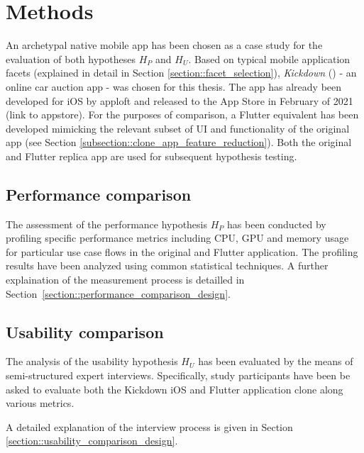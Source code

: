 \section{Methods} \label{section::methods}
An archetypal native mobile app has been chosen as a case study for the evaluation of both hypotheses $H_P$ and $H_U$.
Based on typical mobile application facets (explained in detail in Section \ref{section::facet_selection}), \textit{Kickdown} (\cite{Kickdown2021}) - an online car auction app - was chosen for this thesis. 
The app has already been developed for iOS by apploft and released to the App Store in February of 2021 (link to appstore).
For the purposes of comparison, a Flutter equivalent has been developed mimicking the relevant subset of UI and functionality of the original app (see Section \ref{subsection::clone_app_feature_reduction}). 
Both the original and Flutter replica app are used for subsequent hypothesis testing.


\subsection{Performance comparison}
The assessment of the performance hypothesis $H_P$ has been conducted by profiling specific performance metrics including CPU, GPU and memory usage 
for particular use case flows in the original and Flutter application. 
The profiling results have been analyzed using common statistical techniques.
A further explaination of the measurement process is detailled in Section~\ref{section::performance_comparison_design}.

\subsection{Usability comparison}
The analysis of the usability hypothesis $H_U$ has been evaluated by the means of semi-structured expert interviews.
Specifically, study participants have been be asked to evaluate both the Kickdown iOS and Flutter application clone along various metrics.

A detailed explanation of the interview process is given in Section \ref{section::usability_comparison_design}.

